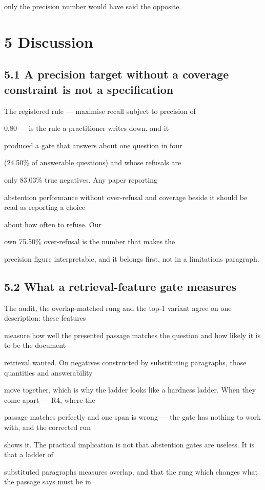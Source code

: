 only the precision number would have said the opposite.

\section{5 Discussion}
\subsection{5.1 A precision target without a coverage constraint is not a specification}
The registered rule --- maximise recall subject to precision of

0.80 --- is the rule a practitioner writes down, and it

produced a gate that answers about one question in four

(24.50\% of answerable questions) and whose refusals are

only 83.03\% true negatives. Any paper reporting

abstention performance without over-refusal and coverage beside it should be read as reporting a choice

about how often to refuse. Our

own 75.50\% over-refusal is the number that makes the

precision figure interpretable, and it belongs first, not in a limitations paragraph.

\subsection{5.2 What a retrieval-feature gate measures}
The audit, the overlap-matched rung and the top-1 variant agree on one description: these features

measure how well the presented passage matches the question and how likely it is to be the document

retrieval wanted. On negatives constructed by substituting paragraphs, those quantities and answerability

move together, which is why the ladder looks like a hardness ladder. When they come apart --- R4, where the

passage matches perfectly and one span is wrong --- the gate has nothing to work with, and the corrected run

shows it. The practical implication is not that abstention gates are useless. It is that a ladder of

substituted paragraphs measures overlap, and that the rung which changes what the passage says must be in

